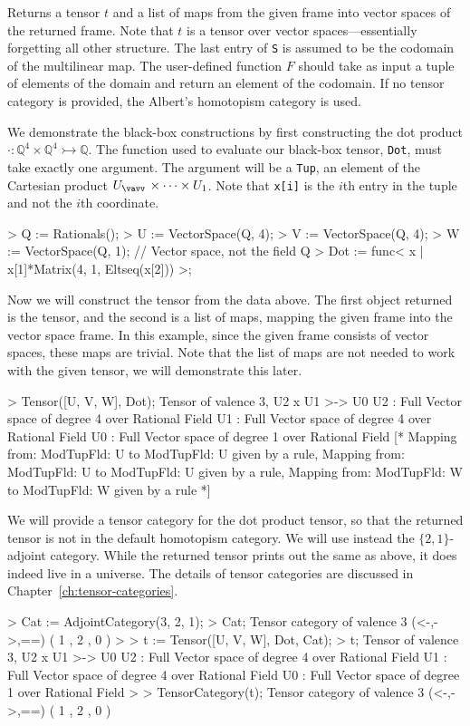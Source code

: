 Returns a tensor $t$ and a list of maps from the given frame into vector spaces of the returned frame.
Note that $t$ is a tensor over vector spaces---essentially forgetting all other structure.
The last entry of \texttt{S} is assumed to be the codomain of the multilinear map. 
The user-defined function $F$ should take as input a tuple of elements of the domain and return an element of the codomain.
If no tensor category is provided, the Albert's homotopism category is used.

\begin{example}[BBTensorsFrame]
We demonstrate the black-box constructions by first constructing the dot product $\cdot : \mathbb{Q}^4\times \mathbb{Q}^4\rightarrowtail \mathbb{Q}$.
The function used to evaluate our black-box tensor, \texttt{Dot}, must take exactly one argument.
The argument will be a \texttt{Tup}, an element of the Cartesian product $U_{\vav}\times \cdots\times U_1$.
Note that \texttt{x[i]} is the $i$th entry in the tuple and not the $i$th coordinate.
\begin{code}
> Q := Rationals();
> U := VectorSpace(Q, 4);
> V := VectorSpace(Q, 4);
> W := VectorSpace(Q, 1);  // Vector space, not the field Q
> Dot := func< x | x[1]*Matrix(4, 1, Eltseq(x[2])) >;
\end{code}

Now we will construct the tensor from the data above.
The first object returned is the tensor, and the second is a list of maps, mapping the given frame into the vector space frame.
In this example, since the given frame consists of vector spaces, these maps are trivial.
Note that the list of maps are not needed to work with the given tensor, we will demonstrate this later. 
\begin{code}
> Tensor([U, V, W], Dot);
Tensor of valence 3, U2 x U1 >-> U0
U2 : Full Vector space of degree 4 over Rational Field
U1 : Full Vector space of degree 4 over Rational Field
U0 : Full Vector space of degree 1 over Rational Field
[*
    Mapping from: ModTupFld: U to ModTupFld: U given by a rule,
    Mapping from: ModTupFld: U to ModTupFld: U given by a rule,
    Mapping from: ModTupFld: W to ModTupFld: W given by a rule
*]
\end{code}

We will provide a tensor category for the dot product tensor, so that the returned tensor is not in the default homotopism category. 
We will use instead the $\{2,1\}$-adjoint category.
While the returned tensor prints out the same as above, it does indeed live in a universe.
The details of tensor categories are discussed in Chapter~\ref{ch:tensor-categories}.
\begin{code}
> Cat := AdjointCategory(3, 2, 1);
> Cat;
Tensor category of valence 3 (<-,->,==) ({ 1 },{ 2 },{ 0 })
> 
> t := Tensor([U, V, W], Dot, Cat);
> t;
Tensor of valence 3, U2 x U1 >-> U0
U2 : Full Vector space of degree 4 over Rational Field
U1 : Full Vector space of degree 4 over Rational Field
U0 : Full Vector space of degree 1 over Rational Field
> 
> TensorCategory(t);
Tensor category of valence 3 (<-,->,==) ({ 1 },{ 2 },{ 0 })
\end{code}
\end{example}


